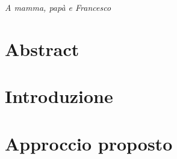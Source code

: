 \documentclass[a4paper, 12pt]{book}
\begin{document}
	\thispagestyle{empty} %
	\cleardoublepage

	\clearpage{\pagestyle{plain}\cleardoublepage}
	\vspace*{\fill}
	\begin{flushright}
		\textit{A mamma, papà e Francesco}
	\end{flushright}
	\vspace*{\fill}
	
		
	\clearpage{\pagestyle{plain}\cleardoublepage}
	\chapter*{Abstract} %
	\label{chapter:zero}
	
	\thispagestyle{empty}
	\clearpage{\pagestyle{plain}\cleardoublepage}
	\tableofcontents %
	
	\clearpage{\pagestyle{plain}\cleardoublepage} %

	\clearpage{\pagestyle{plain}\cleardoublepage} %
	\chapter{Introduzione} %
	\label{chapter:primo} %
	
	\clearpage{\pagestyle{plain}\cleardoublepage} %
	\chapter{Approccio proposto} %
	\label{chapter:secondo} %

	\clearpage{\pagestyle{plain}\cleardoublepage} %
\end{document}
